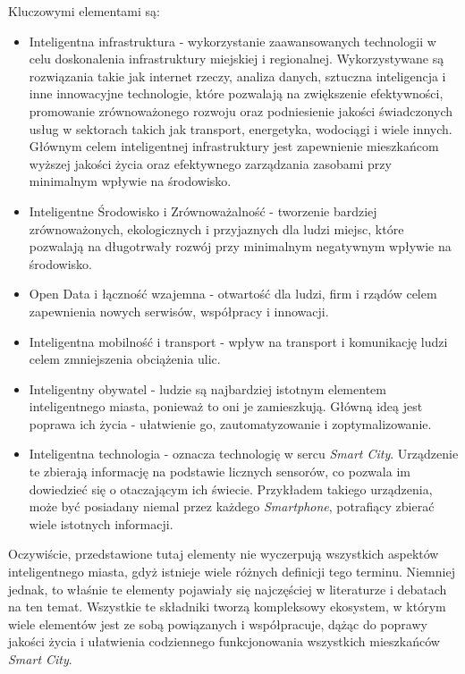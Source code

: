 \par Kluczowymi elementami są:
\begin{itemize}
    \item Inteligentna infrastruktura - wykorzystanie zaawansowanych technologii w celu doskonalenia infrastruktury miejskiej i regionalnej. Wykorzystywane są rozwiązania takie jak internet rzeczy, analiza danych, sztuczna inteligencja i inne innowacyjne technologie, które pozwalają na zwiększenie efektywności, promowanie zrównoważonego rozwoju oraz podniesienie jakości świadczonych usług w sektorach takich jak transport, energetyka, wodociągi i wiele innych. Głównym celem inteligentnej infrastruktury jest zapewnienie mieszkańcom wyższej jakości życia oraz efektywnego zarządzania zasobami przy minimalnym wpływie na środowisko.
    \item Inteligentne Środowisko i Zrównoważalność - tworzenie bardziej zrównoważonych, ekologicznych i przyjaznych dla ludzi miejsc, które pozwalają na długotrwały rozwój przy minimalnym negatywnym wpływie na środowisko.
    \item Open Data i łączność wzajemna - otwartość dla ludzi, firm i rządów celem zapewnienia nowych serwisów, współpracy i innowacji.
    \item Inteligentna mobilność i transport - wpływ na transport i komunikację ludzi celem zmniejszenia obciążenia ulic.
    \item Inteligentny obywatel - ludzie są najbardziej istotnym elementem inteligentnego miasta, ponieważ to oni je zamieszkują. Główną ideą jest poprawa ich życia - ułatwienie go, zautomatyzowanie i zoptymalizowanie.
    \item Inteligentna technologia - oznacza technologię w sercu \emph{Smart City}. Urządzenie te zbierają informację na podstawie licznych sensorów, co pozwala im dowiedzieć się o otaczającym ich świecie. Przykładem takiego urządzenia, może być posiadany niemal przez każdego \emph{Smartphone}, potrafiący zbierać wiele istotnych informacji.
\end{itemize}

\par Oczywiście, przedstawione tutaj elementy nie wyczerpują wszystkich aspektów inteligentnego miasta, gdyż istnieje wiele różnych definicji tego terminu. Niemniej jednak, to właśnie te elementy pojawiały się najczęściej w literaturze i debatach na ten temat. Wszystkie te składniki tworzą kompleksowy ekosystem, w którym wiele elementów jest ze sobą powiązanych i współpracuje, dążąc do poprawy jakości życia i ułatwienia codziennego funkcjonowania wszystkich mieszkańców \emph{Smart City}.


